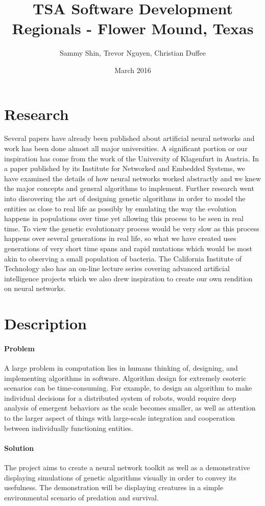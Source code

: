 \documentclass[]{article}
\title{TSA Software Development \\ Regionals - Flower Mound, Texas}
\author{Sammy Shin, Trevor Nguyen, Christian Duffee}
\date{March 2016}
\begin{document}
\maketitle

\cleardoublepage
\tableofcontents

\cleardoublepage
\section{Research}
	\Large Several papers have already been published about artificial neural networks and work has been done almost all major universities. A significant portion or our inspiration has come from the work of the University of Klagenfurt in Austria. In a paper published by its Institute for Networked and Embedded Systems, we have examined the details of how neural networks worked abstractly and we knew the major concepts and general algorithms to implement. Further research went into discovering the art of designing genetic algorithms in order to model the entities as close to real life as possibly by emulating the way the evolution happens in populations over time yet allowing this process to be seen in real time. To view the genetic evolutionary process would be very slow as this process happens over several generations in real life, so what we have created uses generations of very short time spans and rapid mutations which would be most akin to observing a small population of bacteria. The California Institute of Technology also has an on-line lecture series covering advanced artificial intelligence projects which we also drew inspiration to create our own rendition on neural networks.
\cleardoublepage
\section{Description}
	\paragraph{Problem} A large problem in computation lies in humans thinking of, designing, and implementing algorithms in software. Algorithm design for extremely esoteric scenarios can be time-consuming. For example, to design an algorithm to make individual decisions for a distributed system of robots, would require deep analysis of emergent behaviors as the scale becomes smaller, as well as attention to the larger aspect of things with large-scale integration and cooperation between individually functioning entities.
	\paragraph{Solution} The project aims to create a neural network toolkit as well as a demonstrative displaying simulations of genetic algorithms visually in order to convey its usefulness. The demonstration will be displaying creatures in a simple environmental scenario of predation and survival.
\end{document}

